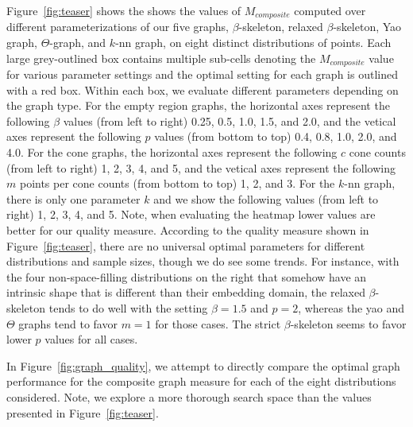 Figure~\ref{fig:teaser} shows the shows the values of $M_{composite}$ computed over different parameterizations of our five graphs, $\beta$-skeleton, relaxed $\beta$-skeleton, Yao graph, $\Theta$-graph, and $k$-nn graph, on eight distinct distributions of points.
%
Each large grey-outlined box contains multiple sub-cells denoting the $M_{composite}$ value for various parameter settings and the optimal setting for each graph is outlined with a red box.
%
Within each box, we evaluate different parameters depending on the graph type.
%
For the empty region graphs, the horizontal axes represent the following $\beta$ values (from left to right)  0.25, 0.5, 1.0, 1.5, and 2.0, and the vetical axes represent the following $p$ values (from bottom to top) 0.4, 0.8, 1.0, 2.0, and 4.0.
%
For the cone graphs, the horizontal axes represent the following $c$ cone counts (from left to right) 1, 2, 3, 4, and 5, and the vetical axes represent the following $m$ points per cone counts (from bottom to top) 1, 2, and 3.
%
For the $k$-nn graph, there is only one parameter $k$ and we show the following values (from left to right)  1, 2, 3, 4, and 5.
%
Note, when evaluating the heatmap lower values are better for our quality measure.
%
According to the quality measure shown in Figure~\ref{fig:teaser}, there are no universal optimal parameters for different distributions and sample sizes, though we do see some trends.
%
For instance, with the four non-space-filling distributions on the right that somehow have an intrinsic shape that is different than their embedding domain, the relaxed $\beta$-skeleton tends to do well with the setting $\beta=1.5$ and $p=2$, whereas the yao and $\Theta$ graphs tend to favor $m=1$ for those cases.
%
The strict $\beta$-skeleton seems to favor lower $p$ values for all cases.

In Figure~\ref{fig:graph_quality}, we attempt to directly compare the optimal graph performance for the composite graph measure for each of the eight distributions considered.
%
Note, we explore a more thorough search space than the values presented in Figure~\ref{fig:teaser}.
%

